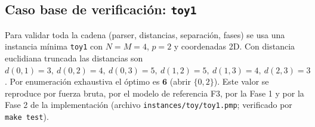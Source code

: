 \subsection{Caso base de verificación: \texttt{toy1}}
Para validar toda la cadena (parser, distancias, separación, fases) se usa una instancia mínima
\texttt{toy1} con $N=M=4$, $p=2$ y coordenadas 2D. Con distancia euclidiana truncada las
distancias son $d(0,1)=3,\ d(0,2)=4,\ d(0,3)=5,\ d(1,2)=5,\ d(1,3)=4,\ d(2,3)=3$. Por
enumeración exhaustiva el óptimo es $\mathbf{6}$ (abrir $\{0,2\}$). Este valor se reproduce por
fuerza bruta, por el modelo de referencia F3, por la Fase 1 y por la Fase 2 de la implementación
(archivo \texttt{instances/toy/toy1.pmp}; verificado por \texttt{make test}).
